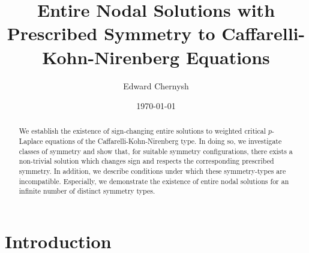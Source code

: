 \documentclass[10pt, reqno]{amsart}
\title[Entire Nodal Solutions of Prescribed Symmetry]{Entire Nodal Solutions with Prescribed Symmetry to Caffarelli-Kohn-Nirenberg Equations}
\author{Edward Chernysh}
\date{\today}
\numberwithin{equation}{section}
\theoremstyle{definition}
\theoremstyle{remark}
\theoremstyle{plain}
\begin{document}
	
	
	\begin{abstract}
		We establish the existence of sign-changing entire solutions to weighted critical $p$-Laplace equations of the Caffarelli-Kohn-Nirenberg type. In doing so, we investigate classes of symmetry and show that, for suitable  symmetry configurations, there exists a non-trivial solution which changes sign and respects the corresponding prescribed symmetry. In addition, we describe conditions under which these symmetry-types are incompatible. Especially, we demonstrate the existence of entire nodal solutions for an infinite number of distinct symmetry types.
	\end{abstract}
	
	
	\maketitle
	
	
	\section{Introduction}
	
\end{document}
